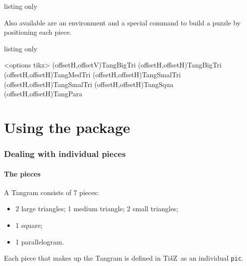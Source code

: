 \documentclass{article}
\providecommand\tikzlogo{Ti\textit{k}Z}
\begin{document}
\begin{PresentationCode}{listing only}
\end{PresentationCode}

Also available are an \textsf{environment} and a special \textsf{command} to build a puzzle by positioning each piece.

\begin{PresentationCode}{listing only}
\begin{EnvTangramTikz}[keys]<options tikz>
	(offsetH,offsetV){TangBigTri}
	(offsetH,offsetH){TangBigTri}
	(offsetH,offsetH){TangMedTri}
	(offsetH,offsetH){TangSmalTri}
	(offsetH,offsetH){TangSmalTri}
	(offsetH,offsetH){TangSqua}
	(offsetH,offsetH){TangPara}
\end{EnvTangramTikz}
\end{PresentationCode}

\pagebreak

\part{Using the package}

\section{Dealing with individual pieces}

\subsection{The pieces}

A Tangram consists of 7 pieces:
\begin{itemize}
	\item 2 large triangles; 1 medium triangle; 2 small triangles;
	\item 1 square;
	\item 1 parallelogram.
\end{itemize}

Each piece that makes up the Tangram is defined in \tikzlogo\ as an individual \texttt{pic}.
\end{document}

